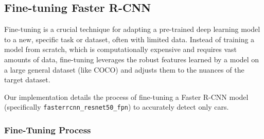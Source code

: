 \documentclass[12pt,a4paper]{article}
\begin{document}
\subsection{Fine-tuning Faster R-CNN}
\label{ssec:fasterrcnn_finetuning}

Fine-tuning is a crucial technique for adapting a pre-trained deep learning model to a new, specific task or dataset, often with limited data. Instead of training a model from scratch, which is computationally expensive and requires vast amounts of data, fine-tuning leverages the robust features learned by a model on a large general dataset (like COCO) and adjusts them to the nuances of the target dataset.

Our implementation details the process of fine-tuning a Faster R-CNN model (specifically \texttt{fasterrcnn\_resnet50\_fpn}) to accurately detect only cars.

\subsubsection{Fine-Tuning Process}
\end{document}
